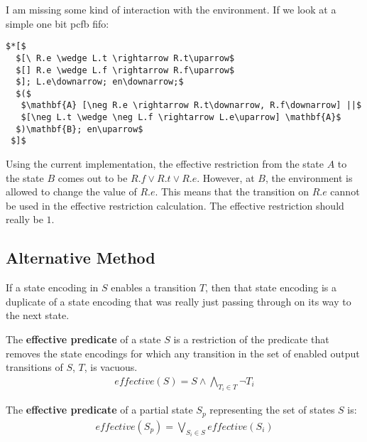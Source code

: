 I am missing some kind of interaction with the environment. If we look at a simple one bit pcfb fifo:

\begin{lstlisting}[caption={PCFB One Bit FIFO}]
$*[$
  $[\ R.e \wedge L.t \rightarrow R.t\uparrow$
  $[] R.e \wedge L.f \rightarrow R.f\uparrow$
  $]; L.e\downarrow; en\downarrow;$
  $($
   $\mathbf{A} [\neg R.e \rightarrow R.t\downarrow, R.f\downarrow] ||$
   $[\neg L.t \wedge \neg L.f \rightarrow L.e\uparrow] \mathbf{A}$
  $)\mathbf{B}; en\uparrow$ 
 $]$
\end{lstlisting}

Using the current implementation, the effective restriction from the state $A$ to the state $B$ comes out to be $R.f \vee R.t \vee R.e$. However, at $B$, the environment is allowed to change the value of $R.e$. This means that the transition on $R.e$ cannot be used in the effective restriction calculation. The effective restriction should really be $1$. 

\subsection{Alternative Method}

If a state encoding in $S$ enables a transition $T$, then that state encoding is a duplicate of a state encoding that was really just passing through on its way to the next state.

\begin{definition}
The \textbf{effective predicate} of a state $S$ is a restriction of the predicate that removes the state encodings for which any transition in the set of enabled output transitions of $S$, $T$, is vacuous.
\begin{align}
effective(S) = S \wedge \bigwedge_{T_i \in T} \neg T_i
\end{align}
\end{definition}

\begin{definition}
The \textbf{effective predicate} of a partial state $S_p$ representing the set of states $S$ is:
\begin{align}
effective(S_p) = \bigvee_{S_i \in S} effective(S_i)
\end{align}
\end{definition}

